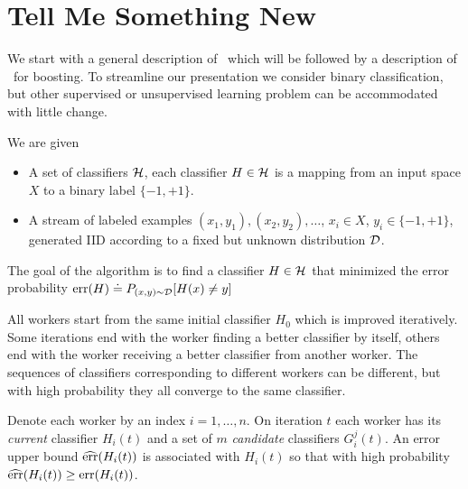 \section{Tell Me Something New}\label{sec:tmsn}
We start with a general description of \tmsn\ which will be followed
by a description of \tmsn\ for boosting. To streamline our presentation
we consider binary classification, but other supervised or
unsupervised learning problem can be accommodated with little change.

We are given
\newcommand{\cD}{{\cal D}}
\begin{itemize}
\item A set of classifiers ${\cal H}$, each classifier $H \in
  {\cal H}$ is a mapping from an input space $X$ to a binary label $\{-1,+1\}$.
\item A stream of labeled examples $(x_1,y_1),(x_2,y_2),\ldots$, $x_i
  \in X$, $y_i \in \{-1,+1\}$, generated IID according to a fixed but
  unknown distribution $\cD$.
\end{itemize}

The goal of the algorithm is to find a classifier $H \in
{\cal H}$ that minimized the error probability $\err(H)\doteq
P_{(x,y) \sim \cD}[H(x) \neq y]$

All workers start from the same initial classifier $H_0$ which is
improved iteratively. Some iterations end with the worker finding a
better classifier by itself, others end with the worker receiving a
better classifier from another worker. The sequences of classifiers
corresponding to different workers can be different, but with high
probability they all converge to the same classifier.

Denote each worker by an index $i=1,\ldots,n$. On iteration $t$
each worker has its {\em current} classifier  $H_i(t)$ and a set of $m$
{\em candidate} classifiers $G_i^j(t)$. An error upper bound
$\widehat{\mbox{err}}(H_i(t))$ is associated with $H_i(t)$ so that with high
probability $\widehat{\mbox{err}}(H_i(t)) \geq \mbox{err}(H_i(t))$.

